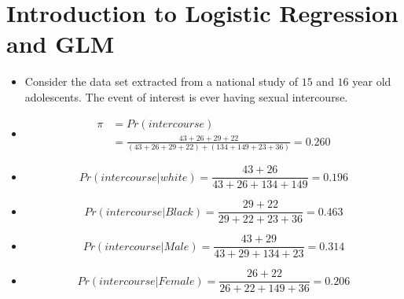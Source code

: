 \documentclass[12pt]{beamer}
\begin{document}
\section{Introduction to Logistic Regression and GLM}

\begin{frame}

  \begin{itemize}
    \item<1-> Consider the data set extracted from a national study
    of $15$ and $16$ year old adolescents. The event of interest
    is ever having sexual intercourse.
  \end{itemize}

\begin{center}
  \fontsize{10}{11}
\end{center}
\end{frame}


\begin{frame}
  \begin{itemize}
    \item<1->
    \begin{equation}
    \begin{split}
    \pi&=Pr(intercourse)\\
    &=\frac{43+26+29+22}{(43+26+29+22)+(134+149+23+36)}=0.260
    \end{split}
    \end{equation}
    \item<2->
    \begin{equation}
    Pr(intercourse|white)=\frac{43+26}{43+26+134+149}=0.196
    \end{equation}
  \end{itemize}
\end{frame}

\begin{frame}
  \begin{itemize}
    \item<1->
    \begin{equation}
    Pr(intercourse|Black)=\frac{29+22}{29+22+23+36}=0.463
    \end{equation}
    \item<2->
    \begin{equation}
    Pr(intercourse|Male)=\frac{43+29}{43+29+134+23}=0.314
    \end{equation}
    \item<3->
    \begin{equation}
    Pr(intercourse|Female)=\frac{26+22}{26+22+149+36}=0.206
    \end{equation}
  \end{itemize}
\end{frame}
\end{document}
